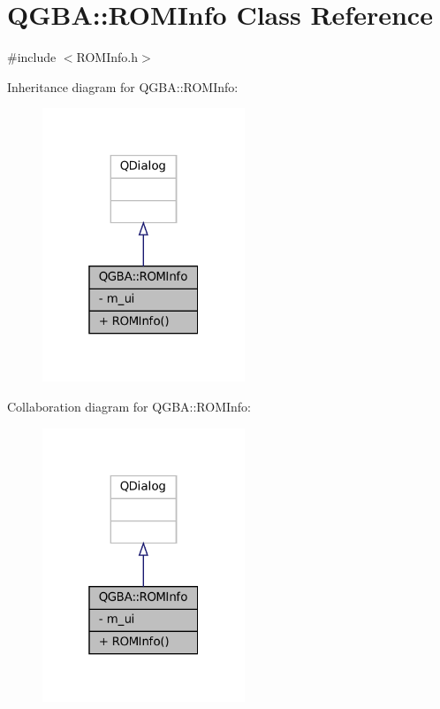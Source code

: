 \hypertarget{class_q_g_b_a_1_1_r_o_m_info}{}\section{Q\+G\+BA\+:\+:R\+O\+M\+Info Class Reference}
\label{class_q_g_b_a_1_1_r_o_m_info}


{\ttfamily \#include $<$R\+O\+M\+Info.\+h$>$}



Inheritance diagram for Q\+G\+BA\+:\+:R\+O\+M\+Info\+:
\nopagebreak
\begin{figure}[H]
\begin{center}
\leavevmode
\includegraphics[width=172pt]{class_q_g_b_a_1_1_r_o_m_info__inherit__graph}
\end{center}
\end{figure}


Collaboration diagram for Q\+G\+BA\+:\+:R\+O\+M\+Info\+:
\nopagebreak
\begin{figure}[H]
\begin{center}
\leavevmode
\includegraphics[width=172pt]{class_q_g_b_a_1_1_r_o_m_info__coll__graph}
\end{center}
\end{figure}
